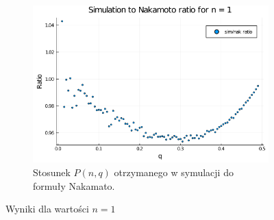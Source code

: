 \documentclass{article}
\begin{document}
\begin{figure}[H]
            \begin{subfigure}{0.65\textwidth}
                \includegraphics[width=\linewidth]{img/mc_to_na_n=1.png}
                \caption{Stosunek $P(n,q)$ otrzymanego w symulacji do formuły Nakamato.}
            \end{subfigure}
    
            \caption{Wyniki dla wartości $n = 1$}
        \end{figure}
\end{document}
